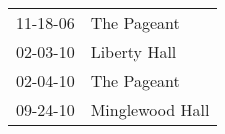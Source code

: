 \begin{supertabular}{p{0.25\columnwidth}p{0.75\columnwidth}}
 11-18-06 &      The Pageant \\
 02-03-10 &     Liberty Hall \\
 02-04-10 &      The Pageant \\
 09-24-10 &  Minglewood Hall \\
\end{supertabular}
